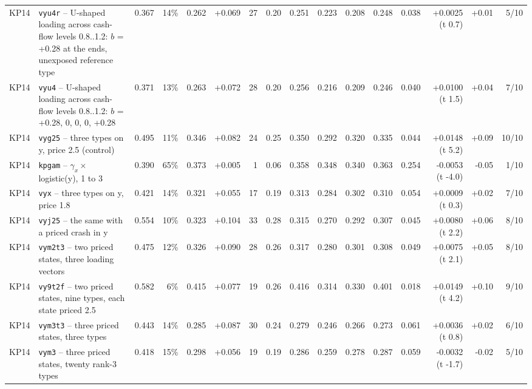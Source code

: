 \begin{landscape}
\begin{longtable}{lp{4.6cm}rrrrrrrrrrrrrr}
KP14 & \texttt{vyu4r} -- U-shaped loading across cash-flow levels 0.8..1.2: $b$ = +0.28 at the ends, unexposed reference type & 0.367 & 14\% & 0.262 & +0.069 & 27 & 0.20 & 0.251 & 0.223 & 0.208 & 0.248 & 0.038 & +0.0025 (t 0.7) & +0.01 & 5/10 \\
KP14 & \texttt{vyu4} -- U-shaped loading across cash-flow levels 0.8..1.2: $b$ = +0.28, 0, 0, 0, +0.28 & 0.371 & 13\% & 0.263 & +0.072 & 28 & 0.20 & 0.256 & 0.216 & 0.209 & 0.246 & 0.040 & +0.0100 (t 1.5) & +0.04 & 7/10 \\
KP14 & \texttt{vyg25} -- three types on y, price 2.5 (control) & 0.495 & 11\% & 0.346 & +0.082 & 24 & 0.25 & 0.350 & 0.292 & 0.320 & 0.335 & 0.044 & +0.0148 (t 5.2) & +0.09 & 10/10 \\
KP14 & \texttt{kpgam} -- $\gamma_x \times$ logistic(y), 1 to 3 & 0.390 & 65\% & 0.373 & +0.005 & 1 & 0.06 & 0.358 & 0.348 & 0.340 & 0.363 & 0.254 & -0.0053 (t -4.0) & -0.05 & 1/10 \\
KP14 & \texttt{vyx} -- three types on y, price 1.8 & 0.421 & 14\% & 0.321 & +0.055 & 17 & 0.19 & 0.313 & 0.284 & 0.302 & 0.310 & 0.054 & +0.0009 (t 0.3) & +0.02 & 7/10 \\
KP14 & \texttt{vyj25} -- the same with a priced crash in y & 0.554 & 10\% & 0.323 & +0.104 & 33 & 0.28 & 0.315 & 0.270 & 0.292 & 0.307 & 0.045 & +0.0080 (t 2.2) & +0.06 & 8/10 \\
KP14 & \texttt{vym2t3} -- two priced states, three loading vectors & 0.475 & 12\% & 0.326 & +0.090 & 28 & 0.26 & 0.317 & 0.280 & 0.301 & 0.308 & 0.049 & +0.0075 (t 2.1) & +0.05 & 8/10 \\
KP14 & \texttt{vy9t2f} -- two priced states, nine types, each state priced 2.5 & 0.582 & 6\% & 0.415 & +0.077 & 19 & 0.26 & 0.416 & 0.314 & 0.330 & 0.401 & 0.018 & +0.0149 (t 4.2) & +0.10 & 9/10 \\
KP14 & \texttt{vym3t3} -- three priced states, three types & 0.443 & 14\% & 0.285 & +0.087 & 30 & 0.24 & 0.279 & 0.246 & 0.266 & 0.273 & 0.061 & +0.0036 (t 0.8) & +0.02 & 6/10 \\
KP14 & \texttt{vym3} -- three priced states, twenty rank-3 types & 0.418 & 15\% & 0.298 & +0.056 & 19 & 0.19 & 0.286 & 0.259 & 0.278 & 0.287 & 0.059 & -0.0032 (t -1.7) & -0.02 & 5/10 \\
\end{longtable}


\end{landscape}
